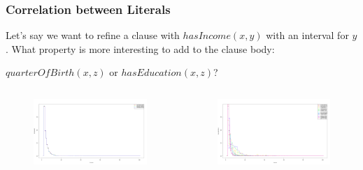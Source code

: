 \documentclass{beamer}
\begin{document}
\begin{frame}
\frametitle{Correlation between Literals}
Let's say we want to refine a clause with $hasIncome(x,y)$ with an interval for $y$.
What property is more interesting to add to the clause body: 
  \begin{center}
   $quarterOfBirth(x,z)$ or $hasEducation(x,z)$?
  \end{center}
\begin{columns}[c]
    \begin{figure}
    \includegraphics[width=1\linewidth]{./Figures/income-birthquarter.png}
    \end{figure}
    \begin{figure}
    \includegraphics[width=1\linewidth]{./Figures/income-education.png}
    \end{figure}
\end{columns}
\end{frame}
\end{document}
